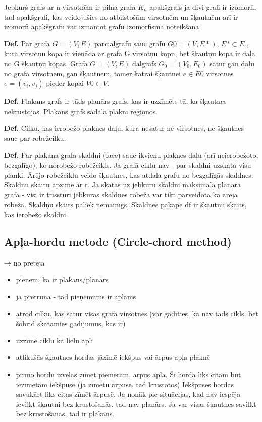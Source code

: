 \documentclass{article}
\begin{document}
Jebkurš grafs ar n virsotnēm ir pilna grafa $K_n$ apakšgrafs ja divi grafi ir izomorfi, tad apakšgrafi, kas veidojušies no atbilstošām virsotnēm un šķautnēm arī ir izomorfi apakšgrafu var izmantot grafu izomorfisma noteikšanā

\textbf{Def.} Par grafa $G = (V,E)$ parciālgrafu sauc grafu $G 0 = (V , E *)$, $E* \subset E$ , kura virsotņu kopa ir vienāda ar grafa G virsotņu kopu, bet šķautņu kopa ir daļa no G šķautņu kopas.  Grafa $G = (V,E)$ daļgrafs $G_0 = (V_0 , E_0 )$ satur gan daļu no grafa virsotnēm, gan šķautnēm, tomēr katrai šķautnei $e \in E 0$ virsotnes $e = (v_i , v_j )$ pieder kopai $V 0 ⊂ V$.

\textbf{Def.} Plakans grafs ir tāds planārs grafs, kas ir uzzīmēts tā, ka šķautnes nekrustojas.  Plakans grafs sadala plakni regionos.

\textbf{Def.}  Cilku, kas ierobežo plaknes daļu, kura nesatur ne virsotnes, ne šķautnes sauc par robežcilku.

\textbf{Def.} Par plakana grafa skaldni (face) sauc ikvienu plaknes daļu (arī neierobežoto, bezgalīgo), ko norobežo robežcikls.  Ja grafā ciklu nav - par skaldni uzskata visu planki.  Ārējo robežciklu veido šķautnes, kas atdala grafu no bezgalīgās skaldnes.  Skaldņu skaitu apzīmē ar r. Ja skatās uz jebkuru skaldni maksimālā planārā grafā - visi ir trīsstūri jebkuras skaldnes robeža var tikt pārveidota kā ārējā robeža. Skaldņu skaits paliek nemainīgs.  Skaldnes pakāpe df ir šķautņu skaits, kas ierobežo skaldni.

\subsection{Apļa-hordu metode (Circle-chord method)}
→ no pretējā
\begin{itemize}
	\item pieņem, ka ir plakans/planārs
	\item ja pretruna - tad pieņēmums ir aplams
\end{itemize}

\begin{itemize}
	\item atrod cilku, kas satur visas grafa virsotnes (var gadīties, ka nav tāds cikls, bet šobrīd skatamies gadījumus, kas ir)
	\item uzzīmē ciklu kā lielu apli 
	\item atlikušās šķautnes-hordas jāzīmē iekšpus vai ārpus apļa plaknē
	\item pirmo hordu izvēlas zīmēt piemēram, ārpus apļa.
	\subitem Šī horda liks citām būt iezīmētām iekšpusē (ja zīmētu ārpusē, tad krustotos) Iekšpuses hordas savukārt liks citas zīmēt ārpusē.
	\subitem Ja nonāk pie situācijas, kad nav iespēja ievilkt šķautni bez krustošanās, tad nav planārs.
	\subitem Ja var visas šķautnes savilkt bez krustošanās, tad ir plakans. 
\end{itemize}
\end{document}

